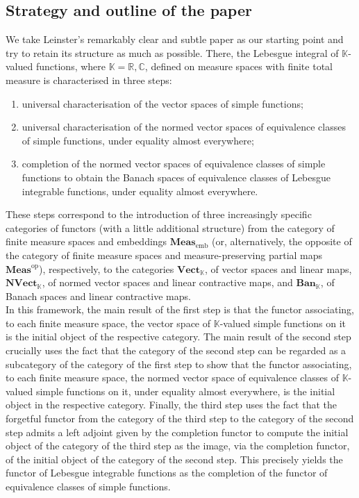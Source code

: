 \documentclass{amsart}
\theoremstyle{definition}
\theoremstyle{plain}
\newcommand{\K}{\mathbb{K}}
\newcommand{\R}{\mathbb{R}}
\newcommand{\C}{\mathbb{C}}
\newcommand{\opMeas}{\mathbf{Meas}^\mathrm{op}}
\newcommand{\embMeas}{\mathbf{Meas}_\mathrm{emb}}
\newcommand{\Vect}{\mathbf{Vect}_{\mathbb{K}}}
\newcommand{\NVect}{\mathbf{NVect}_{\mathbb{K}}}
\newcommand{\Ban}{\mathbf{Ban}_{\mathbb{K}}}
\begin{document}
    \subsection{Strategy and outline of the paper}

        We take Leinster's remarkably clear and subtle paper \cite{Leinster2023} as our starting point and try to retain its structure as much as possible.
        There, the Lebesgue integral of $\K$-valued functions, where $\K = \R, \C$, defined on measure spaces with finite total measure is characterised in three steps:
        \begin{enumerate}
            \item universal characterisation of the vector spaces of simple functions;
            \item universal characterisation of the normed vector spaces of equivalence classes of simple functions, under equality almost everywhere;
            \item completion of the normed vector spaces of equivalence classes of simple functions to obtain the Banach spaces of equivalence classes of Lebesgue integrable functions, under equality almost everywhere.
        \end{enumerate}
        These steps correspond to the introduction of three increasingly specific categories of functors (with a little additional structure) from the category of finite measure spaces and embeddings $\embMeas$ (or, alternatively, the opposite of the category of finite measure spaces and measure-preserving partial maps $\opMeas$), respectively, to the categories $\Vect$, of vector spaces and linear maps, $\NVect$, of normed vector spaces and linear contractive maps, and $\Ban$, of Banach spaces and linear contractive maps. \\
        In this framework, the main result of the first step is that the functor associating, to each finite measure space, the vector space of $\K$-valued simple functions on it is the initial object of the respective category. 
        The main result of the second step crucially uses the fact that the category of the second step can be regarded as a subcategory of the category of the first step to show that the functor associating, to each finite measure space, the normed vector space of equivalence classes of $\K$-valued simple functions on it, under equality almost everywhere, is the initial object in the respective category. 
        Finally, the third step uses the fact that the forgetful functor from the category of the third step to the category of the second step admits a left adjoint given by the completion functor to compute the initial object of the category of the third step as the image, via the completion functor, of the initial object of the category of the second step.
        This precisely yields the functor of Lebesgue integrable functions as the completion of the functor of equivalence classes of simple functions. 
        
\end{document}
